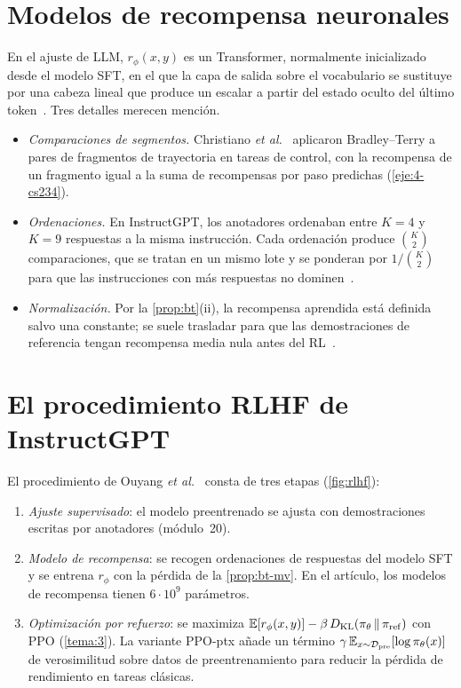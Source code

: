 \section{Modelos de recompensa neuronales}

En el ajuste de LLM, $r_\phi(x,y)$ es un Transformer, normalmente inicializado desde el modelo SFT, en el que la capa de salida sobre el vocabulario se sustituye por una cabeza lineal que produce un escalar a partir del estado oculto del último token~\cite{stiennon,instructgpt}. Tres detalles merecen mención.
\begin{itemize}[leftmargin=1.4em,label=\textendash]
  \item \emph{Comparaciones de segmentos.} Christiano \emph{et al.}~\cite{christiano} aplicaron Bradley--Terry a pares de fragmentos de trayectoria en tareas de control, con la recompensa de un fragmento igual a la suma de recompensas por paso predichas (\cref{eje:4-cs234}).
  \item \emph{Ordenaciones.} En InstructGPT, los anotadores ordenaban entre $K=4$ y $K=9$ respuestas a la misma instrucción. Cada ordenación produce $\binom{K}{2}$ comparaciones, que se tratan en un mismo lote y se ponderan por $1/\binom{K}{2}$ para que las instrucciones con más respuestas no dominen~\cite[§3.5]{instructgpt}.
  \item \emph{Normalización.} Por la \cref{prop:bt}(ii), la recompensa aprendida está definida salvo una constante; se suele trasladar para que las demostraciones de referencia tengan recompensa media nula antes del RL~\cite{stiennon,instructgpt}.
\end{itemize}

\section{El procedimiento RLHF de InstructGPT}

\addtocounter{figure}{1}%

El procedimiento de Ouyang \emph{et al.}~\cite[§3.5]{instructgpt} consta de tres etapas (\cref{fig:rlhf}):
\begin{enumerate}[label=\arabic*.]
  \item \emph{Ajuste supervisado}: el modelo preentrenado se ajusta con demostraciones escritas por anotadores (módulo~20).
  \item \emph{Modelo de recompensa}: se recogen ordenaciones de respuestas del modelo SFT y se entrena $r_\phi$ con la pérdida de la \cref{prop:bt-mv}. En el artículo, los modelos de recompensa tienen $6\cdot 10^{9}$ parámetros.
  \item \emph{Optimización por refuerzo}: se maximiza $\mathbb{E}[r_\phi(x,y)]-\beta\,D_{\mathrm{KL}}(\pi_\theta\,\|\,\pi_{\mathrm{ref}})$ con PPO (\cref{tema:3}). La variante PPO-ptx añade un término $\gamma\,\mathbb{E}_{x\sim\mathcal{D}_{\mathrm{pre}}}[\log\pi_\theta(x)]$ de verosimilitud sobre datos de preentrenamiento para reducir la pérdida de rendimiento en tareas clásicas.
\end{enumerate}

